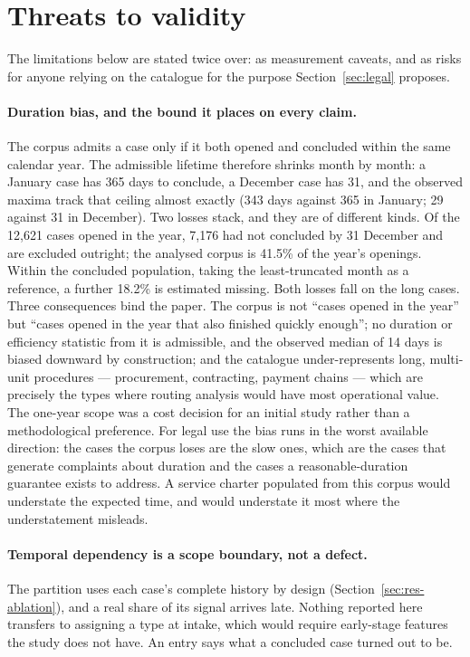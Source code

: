 \section{Threats to validity}\label{sec:threats}

The limitations below are stated twice over: as measurement caveats, and as risks for anyone
relying on the catalogue for the purpose Section~\ref{sec:legal} proposes.

\paragraph{Duration bias, and the bound it places on every claim.}
The corpus admits a case only if it both opened and concluded within the same calendar year.
The admissible lifetime therefore shrinks month by month: a January case has 365 days to
conclude, a December case has 31, and the observed maxima track that ceiling almost exactly
(343 days against 365 in January; 29 against 31 in December). Two losses stack, and they are of
different kinds. Of the 12{,}621 cases opened in the year, 7{,}176 had not concluded by
31 December and are excluded outright; the analysed corpus is 41.5\% of the year's openings.
Within the concluded population, taking the least-truncated month as a reference, a further
18.2\% is estimated missing. Both losses fall on the long cases. Three consequences bind the
paper. The corpus is not
``cases opened in the year'' but ``cases opened in the year that also finished quickly enough'';
no duration or efficiency statistic from it is admissible, and the observed median of 14 days is
biased downward by construction; and the catalogue under-represents long, multi-unit
procedures --- procurement, contracting, payment chains --- which are precisely the types where
routing analysis would have most operational value. The one-year scope was a cost decision for
an initial study rather than a methodological preference. For legal use the bias runs in the
worst available direction: the cases the corpus loses are the slow ones, which are the cases
that generate complaints about duration and the cases a reasonable-duration guarantee exists to
address. A service charter populated from this corpus would understate the expected time, and
would understate it most where the understatement misleads.

\paragraph{Temporal dependency is a scope boundary, not a defect.}
The partition uses each case's complete history by design (Section~\ref{sec:res-ablation}), and
a real share of its signal arrives late. Nothing reported here transfers to assigning a type at
intake, which would require early-stage features the study does not have. An entry says what a
concluded case turned out to be.

